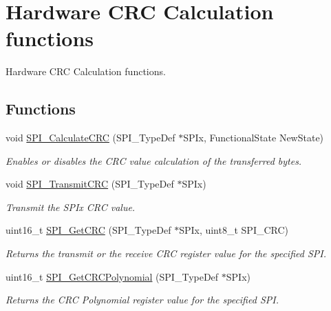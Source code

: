 \hypertarget{group___s_p_i___group3}{}\section{Hardware C\+RC Calculation functions}
\label{group___s_p_i___group3}


Hardware C\+RC Calculation functions.  


\subsection*{Functions}
\begin{DoxyCompactItemize}
\item 
void \mbox{\hyperlink{group___s_p_i___group3_ga64f7276d119e6cb58afc100f8832adb0}{S\+P\+I\+\_\+\+Calculate\+C\+RC}} (S\+P\+I\+\_\+\+Type\+Def $\ast$S\+P\+Ix, Functional\+State New\+State)
\begin{DoxyCompactList}\small\item\em Enables or disables the C\+RC value calculation of the transferred bytes. \end{DoxyCompactList}\item 
void \mbox{\hyperlink{group___s_p_i___group3_gace8b1058e09bab150b0dbe5978810273}{S\+P\+I\+\_\+\+Transmit\+C\+RC}} (S\+P\+I\+\_\+\+Type\+Def $\ast$S\+P\+Ix)
\begin{DoxyCompactList}\small\item\em Transmit the S\+P\+Ix C\+RC value. \end{DoxyCompactList}\item 
uint16\+\_\+t \mbox{\hyperlink{group___s_p_i___group3_ga4c81c193516e82cf0a2fdc149ef20cc6}{S\+P\+I\+\_\+\+Get\+C\+RC}} (S\+P\+I\+\_\+\+Type\+Def $\ast$S\+P\+Ix, uint8\+\_\+t S\+P\+I\+\_\+\+C\+RC)
\begin{DoxyCompactList}\small\item\em Returns the transmit or the receive C\+RC register value for the specified S\+PI. \end{DoxyCompactList}\item 
uint16\+\_\+t \mbox{\hyperlink{group___s_p_i___group3_ga80fb9374cfce670f29128bb78568353f}{S\+P\+I\+\_\+\+Get\+C\+R\+C\+Polynomial}} (S\+P\+I\+\_\+\+Type\+Def $\ast$S\+P\+Ix)
\begin{DoxyCompactList}\small\item\em Returns the C\+RC Polynomial register value for the specified S\+PI. \end{DoxyCompactList}\end{DoxyCompactItemize}


